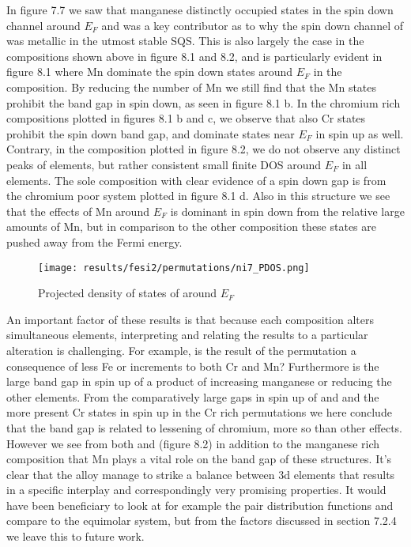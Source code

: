 In figure 7.7 we saw that manganese distinctly occupied states in the spin down channel around $E_F$ and was a key contributor as to why the spin down channel of  was metallic in the utmost stable SQS. This is also largely the case in the compositions shown above in figure 8.1 and 8.2, and is particularly evident in figure 8.1 where Mn dominate the spin down states around $E_F$ in the  composition. By reducing the number of Mn we still find that the Mn states prohibit the band gap in spin down, as seen in figure 8.1 b. In the chromium rich compositions plotted in figures 8.1 b and c, we observe that also Cr states prohibit the spin down band gap, and dominate states near $E_F$ in spin up as well. Contrary, in the  composition plotted in figure 8.2, we do not observe any distinct peaks of elements, but rather consistent small finite DOS around $E_F$ in all elements.  The sole composition with clear evidence of a spin down gap is from the chromium poor system plotted in figure 8.1 d. Also in this structure we see that the effects of Mn around $E_F$ is dominant in spin down from the relative large amounts of Mn, but in comparison to the other composition these states are pushed away from the Fermi energy.

\begin{figure}[H]
	\centering
	\texttt{[image: results/fesi2/permutations/ni7\_PDOS.png]}
	\caption{Projected density of states of  around $E_F$}
\end{figure}

An important factor of these results is that because each composition alters simultaneous elements, interpreting and relating the results to a particular alteration is challenging. For example, is the result of the  permutation a consequence of less Fe or increments to both Cr and Mn? Furthermore is the large band gap in spin up of  a product of increasing manganese or reducing the other elements. From the comparatively large gaps in spin up of  and  and the more present Cr states in spin up in the Cr rich permutations we here conclude that the band gap is related to lessening of chromium, more so than other effects. However we see from both  and  (figure 8.2) in addition to the manganese rich composition that Mn plays a vital role on the band gap of these structures. It's clear that the  alloy manage to strike a balance between 3d elements that results in a specific interplay and correspondingly very promising properties. It would have been beneficiary to look at for example the pair distribution functions and compare to the equimolar system, but from the factors discussed in section 7.2.4 we leave this to future work. 

